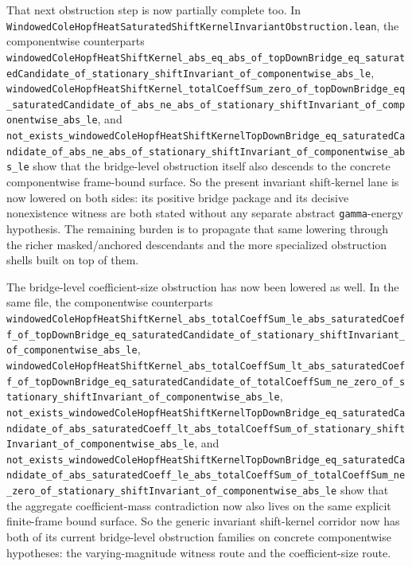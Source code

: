 \documentclass[11pt]{article}
\theoremstyle{remark}
\begin{document}
That next obstruction step is now partially complete too.  In
\texttt{WindowedColeHopfHeatSaturatedShiftKernelInvariantObstruction.lean}, the
componentwise counterparts
\texttt{windowedColeHopfHeatShiftKernel\_abs\_eq\_abs\_of\_topDownBridge\_eq\_saturatedCandidate\_of\_stationary\_shiftInvariant\_of\_componentwise\_abs\_le},
\texttt{windowedColeHopfHeatShiftKernel\_totalCoeffSum\_zero\_of\_topDownBridge\_eq\_saturatedCandidate\_of\_abs\_ne\_abs\_of\_stationary\_shiftInvariant\_of\_componentwise\_abs\_le},
and
\texttt{not\_exists\_windowedColeHopfHeatShiftKernelTopDownBridge\_eq\_saturatedCandidate\_of\_abs\_ne\_abs\_of\_stationary\_shiftInvariant\_of\_componentwise\_abs\_le}
show that the bridge-level obstruction itself also descends to the concrete
componentwise frame-bound surface.  So the present invariant shift-kernel lane
is now lowered on both sides: its positive bridge package and its decisive
nonexistence witness are both stated without any separate abstract
\texttt{gamma}-energy hypothesis.  The remaining burden is to propagate that
same lowering through the richer masked/anchored descendants and the more
specialized obstruction shells built on top of them.

The bridge-level coefficient-size obstruction has now been lowered as well.  In
the same file, the componentwise counterparts
\texttt{windowedColeHopfHeatShiftKernel\_abs\_totalCoeffSum\_le\_abs\_saturatedCoeff\_of\_topDownBridge\_eq\_saturatedCandidate\_of\_stationary\_shiftInvariant\_of\_componentwise\_abs\_le},
\texttt{windowedColeHopfHeatShiftKernel\_abs\_totalCoeffSum\_lt\_abs\_saturatedCoeff\_of\_topDownBridge\_eq\_saturatedCandidate\_of\_totalCoeffSum\_ne\_zero\_of\_stationary\_shiftInvariant\_of\_componentwise\_abs\_le},
\texttt{not\_exists\_windowedColeHopfHeatShiftKernelTopDownBridge\_eq\_saturatedCandidate\_of\_abs\_saturatedCoeff\_lt\_abs\_totalCoeffSum\_of\_stationary\_shiftInvariant\_of\_componentwise\_abs\_le},
and
\texttt{not\_exists\_windowedColeHopfHeatShiftKernelTopDownBridge\_eq\_saturatedCandidate\_of\_abs\_saturatedCoeff\_le\_abs\_totalCoeffSum\_of\_totalCoeffSum\_ne\_zero\_of\_stationary\_shiftInvariant\_of\_componentwise\_abs\_le}
show that the aggregate coefficient-mass contradiction now also lives on the
same explicit finite-frame bound surface.  So the generic invariant
shift-kernel corridor now has both of its current bridge-level obstruction
families on concrete componentwise hypotheses: the varying-magnitude witness
route and the coefficient-size route.
\end{document}
